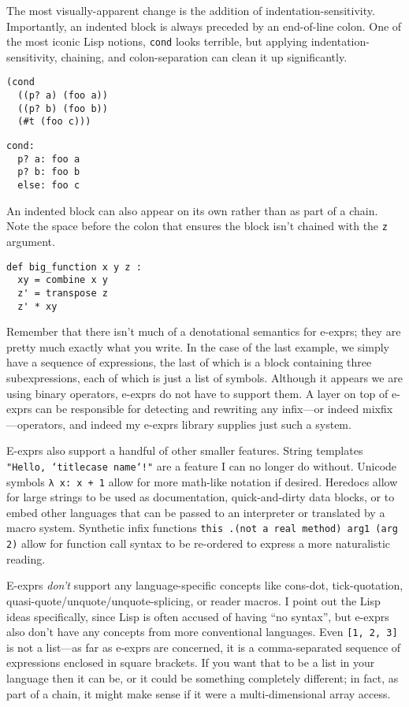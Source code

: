\documentclass[11pt]{article} %
\begin{document}
The most visually-apparent change is the addition of indentation-sensitivity.
Importantly, an indented block is always preceded by an end-of-line colon.
One of the most iconic Lisp notions, \texttt{cond} looks terrible, but applying indentation-sensitivity, chaining, and colon-separation can clean it up significantly.
\begin{center}
\begin{verbatim}
(cond
  ((p? a) (foo a))
  ((p? b) (foo b))
  (#t (foo c)))
\end{verbatim}
\begin{verbatim}
cond:
  p? a: foo a
  p? b: foo b
  else: foo c
\end{verbatim}
\end{center}
An indented block can also appear on its own rather than as part of a chain.
Note the space before the colon that ensures the block isn't chained with the \texttt{z} argument.
\begin{center}
\begin{verbatim}
def big_function x y z :
  xy = combine x y
  z' = transpose z
  z' * xy
\end{verbatim}
\end{center}


Remember that there isn't much of a denotational semantics for e-exprs; they are pretty much exactly what you write.
In the case of the last example, we simply have a sequence of expressions, the last of which is a block containing three subexpressions, each of which is just a list of symbols.
Although it appears we are using binary operators, e-exprs do not have to support them.
A layer on top of e-exprs can be responsible for detecting and rewriting any infix---or indeed mixfix---operators, and indeed my e-exprs library supplies just such a system.

E-exprs also support a handful of other smaller features.
String templates \texttt{"Hello, `titlecase name`!"} are a feature I can no longer do without.
Unicode symbols \texttt{λ x: x + 1} allow for more math-like notation if desired.
Heredocs allow for large strings to be used as documentation, quick-and-dirty data blocks, or to embed other languages that can be passed to an interpreter or translated by a macro system.
Synthetic infix functions \texttt{this .(not a real method) arg1 (arg 2)} allow for function call syntax to be re-ordered to express a more naturalistic reading.

E-exprs \emph{don't} support any language-specific concepts like cons-dot, tick-quotation, quasi-quote/unquote/unquote-splicing, or reader macros.
I point out the Lisp ideas specifically, since Lisp is often accused of having ``no syntax'', but e-exprs also don't have any concepts from more conventional languages.
Even \texttt{[1, 2, 3]} is not a list---as far as e-exprs are concerned, it is a comma-separated sequence of expressions enclosed in square brackets.
If you want that to be a list in your language then it can be, or it could be something completely different; in fact, as part of a chain, it might make sense if it were a multi-dimensional array access.
\end{document}
